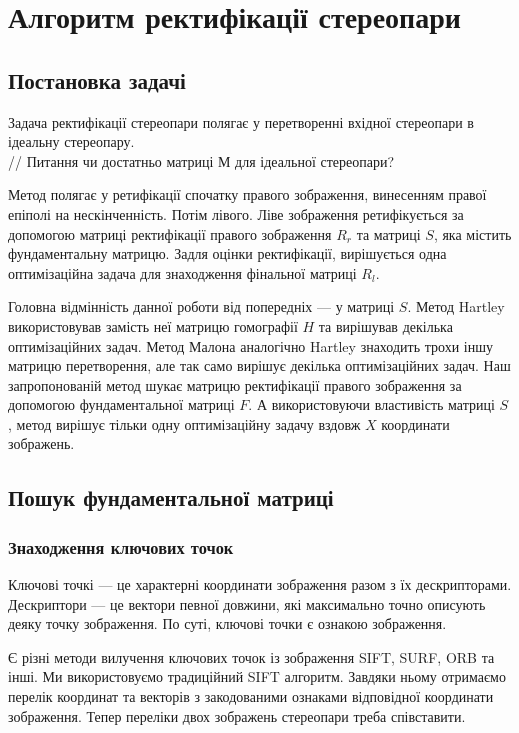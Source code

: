 \chapter{Алгоритм ректифікації стереопари}



\section{Постановка задачі}
Задача ректифікації стереопари полягає у перетворенні вхідної стереопари в
ідеальну стереопару. 
\\// Питання чи достатньо матриці М для ідеальної стереопари?

Метод полягає у ретифікації спочатку правого зображення, винесенням правої 
епіполі на нескінченність. Потім лівого. Ліве зображення ретифікується за 
допомогою матриці ректифікації правого зображення $R_r$ та матриці $S$, яка 
містить фундаментальну матрицю. Задля оцінки ректифікації, вирішується одна 
оптимізаційна задача для знаходження фінальної матриці $R_l$.

Головна відмінність данної роботи від попередніх --- у матриці $S$. Метод 
Hartley\cite{DBLP:journals/ijcv/Hartley99} використовував замість неї матрицю 
гомографії $H$ та вирішував декілька оптимізаційних задач. Метод 
Малона\cite{Mallon2005ProjectiveRF} аналогічно Hartley знаходить трохи іншу 
матрицю перетворення, але так само вирішує декілька оптимізаційних задач. Наш 
запропонованій метод шукає матрицю ректифікації правого зображення за допомогою 
фундаментальної матриці $F$. А використовуючи властивість матриці $S$, метод 
вирішує тільки одну оптимізаційну задачу вздовж $X$ координати зображень.



\section{Пошук фундаментальної матриці}
\subsection{Знаходження ключових точок}
Ключові точкі --- це характерні координати зображення разом з їх дескрипторами.
Дескриптори --- це вектори певної довжини, які максимально точно описують деяку 
точку зображення. По суті, ключові точки є ознакою зображення.

Є різні методи вилучення ключових точок із зображення 
SIFT\cite{10.1023/B:VISI.0000029664.99615.94}, SURF\cite{Bay2006SURFSU}, 
ORB\cite{6126544} та інші. Ми використовуємо традиційний SIFT алгоритм. 
Завдяки ньому отримаємо перелік координат та векторів з закодованими 
ознаками відповідної координати зображення. Тепер переліки двох зображень 
стереопари треба співставити.


